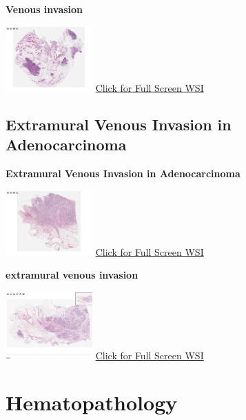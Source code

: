 \documentclass[
  letterpaper,
  paper=6in:9in,
  pagesize=pdftex,
  headinclude=on,
  footinclude=on,
  12pt]{scrbook}
\begin{document}
\textbf{Venous invasion}

\href{https://images.patolojiatlasi.com/venous-invasion/HE.html}{\includegraphics[width=0.25\textwidth,height=\textheight]{./screenshots/venous-invasion_screenshot.png}}
\href{https://images.patolojiatlasi.com/venous-invasion/HE.html}{Click
for Full Screen WSI}

\hypertarget{sec-extramural-venoz-invazyon-in-adenocarcinoma}{%
\chapter{Extramural Venous Invasion in
Adenocarcinoma}\label{sec-extramural-venoz-invazyon-in-adenocarcinoma}}

\textbf{Extramural Venous Invasion in Adenocarcinoma}

\href{https://images.patolojiatlasi.com/extramuralvenousinvasion/HE.html}{\includegraphics[width=0.25\textwidth,height=\textheight]{./screenshots/extramuralvenousinvasion_screenshot.png}}
\href{https://images.patolojiatlasi.com/extramuralvenousinvasion/HE.html}{Click
for Full Screen WSI}

\textbf{extramural venous invasion}

\href{https://images.patolojiatlasi.com/extramural-venous-invasion/HE.html}{\includegraphics[width=0.25\textwidth,height=\textheight]{./screenshots/extramural-venous-invasion_screenshot.png}}
\href{https://images.patolojiatlasi.com/extramural-venous-invasion/HE.html}{Click
for Full Screen WSI}

\part{Hematopathology}
\end{document}
